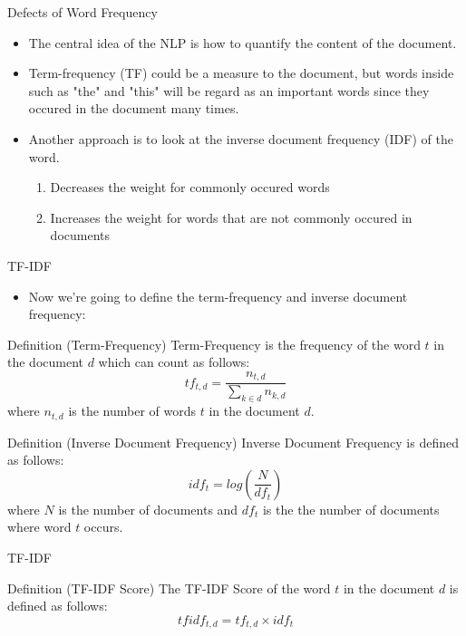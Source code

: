 \begin{frame}[fragile]{Defects of Word Frequency}

    \begin{itemize}
        \item The central idea of the NLP is how to quantify the content of the document.
        \item Term-frequency (TF) could be a measure to the document, but words inside such as "the" and "this" will be regard as an important words since they occured in the document many times.
        \item Another approach is to look at the inverse document frequency (IDF) of the word.
              \begin{enumerate}
                  \item Decreases the weight for commonly occured words
                  \item Increases the weight for words that are not commonly occured in documents
              \end{enumerate}
    \end{itemize}

\end{frame}

\begin{frame}[fragile]{TF-IDF}

    \begin{itemize}
        \item Now we're going to define the term-frequency and inverse document frequency:
    \end{itemize}
    \begin{block}{Definition (Term-Frequency)}
        Term-Frequency is the frequency of the word $t$ in the document $d$ which can count as follows:
        $$tf_{t,d} = \frac{n_{t,d}}{\sum_{k \in d} n_{k,d}}$$
        where $n_{t,d}$ is the number of words $t$ in the document $d$.
    \end{block}
    \begin{block}{Definition (Inverse Document Frequency)}
        Inverse Document Frequency is defined as follows:
        $$idf_{t} = log(\frac{N}{df_{t}})$$
        where $N$ is the number of documents and $df_{t}$ is the the number of documents where word $t$ occurs.
    \end{block}

\end{frame}

\begin{frame}[fragile]{TF-IDF}

    \begin{block}{Definition (TF-IDF Score)}
        The TF-IDF Score of the word $t$ in the document $d$ is defined as follows:
        $$tfidf_{t,d} = tf_{t,d} \times idf_{t}$$
    \end{block}

\end{frame}

